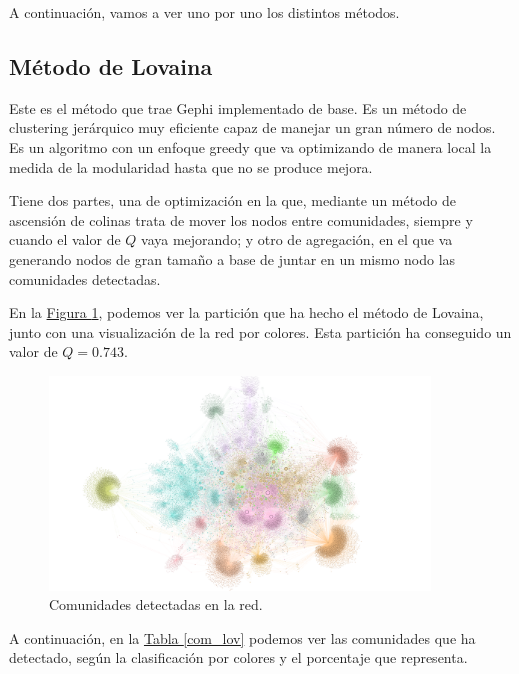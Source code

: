 \documentclass[paper=a4, fontsize=11pt]{article} %
\numberwithin{equation}{section} %
\numberwithin{figure}{section} %
\numberwithin{table}{section} %
\begin{document}
A continuación, vamos a ver uno por uno los distintos métodos.

\subsection{Método de Lovaina}

Este es el método que trae Gephi implementado de base. Es un método de clustering jerárquico muy eficiente capaz de manejar un gran número de nodos. Es un algoritmo con un enfoque greedy que va optimizando de manera local la medida de la modularidad hasta que no se produce mejora.

Tiene dos partes, una de optimización en la que, mediante un método de ascensión de colinas trata de mover los nodos entre comunidades, siempre y cuando el valor de $Q$ vaya mejorando; y otro de agregación, en el que va generando nodos de gran tamaño a base de juntar en un mismo nodo las comunidades detectadas.

En la \hyperref[im7]{Figura \ref*{im7}}, podemos ver la partición que ha hecho el método de Lovaina, junto con una visualización de la red por colores. Esta partición ha conseguido un valor de $Q = 0.743$.

\begin{figure}[H]
  \centering
  \includegraphics[width=0.9\textwidth]{img/community}
  \caption{Comunidades detectadas en la red.}
  \label{im7}
\end{figure}

A continuación, en la \hyperref[com_lov]{Tabla \ref*{com_lov}} podemos ver las comunidades que ha detectado, según la clasificación por colores y el porcentaje que representa.
\end{document}
